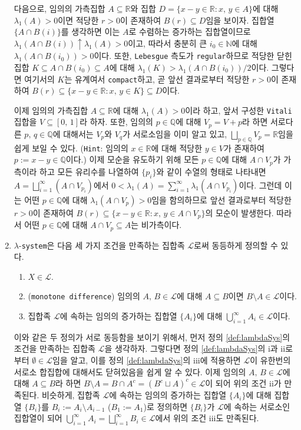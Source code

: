 \begin{enumerate}[label = \textsf{\textbf{\arabic*}}]
    다음으로, 임의의 가측집합 $A\subseteq\mathbb{R}$와 집합 $D=\{x-y\in\mathbb{R}:x,\,y\in A\}$에 대해 $\lambda_1(A)>0$이면 적당한 $r>0$이 존재하여 $B(r)\subseteq D$임을 보이자. 집합열 $\{A\cap B(i)\}$를 생각하면 이는 $A$로 수렴하는 증가하는 집합열이므로 $\lambda_1(A\cap B(i))\uparrow\lambda_1(A)>0$이고, 따라서 충분히 큰 $i_0\in\mathbb{N}$에 대해 $\lambda_1(A\cap B(i_0))>0$이다. 또한, \texttt{Lebesgue} 측도가 \texttt{regular}하므로 적당한 닫힌집합 $K\subseteq A\cap B(i_0)\subseteq A$에 대해 $\lambda_1(K)>\lambda_1(A\cap B(i_0))/2$이다. 그렇다면 여기서의 $K$는 유계여서 \texttt{compact}하고, 곧 앞선 결과로부터 적당한 $r>0$이 존재하여 $B(r)\subseteq\{x-y\in\mathbb{R}:x,\,y\in K\}\subseteq D$이다.
    
    이제 임의의 가측집합 $A\subseteq\mathbb{R}$에 대해 $\lambda_1(A)>0$이라 하고, 앞서 구성한 \texttt{Vitali} 집합을 $V\subseteq[0,\,1]$라 하자. 또한, 임의의 $p\in\mathbb{Q}$에 대해 $V_p=V+p$라 하면 서로다른 $p,\,q\in\mathbb{Q}$에 대해서는 $V_p$와 $V_q$가 서로소임을 이미 알고 있고, $\bigsqcup_{p\in\mathbb{Q}}V_p=\mathbb{R}$임을 쉽게 보일 수 있다. (\texttt{Hint}: 임의의 $x\in\mathbb{R}$에 대해 적당한 $y\in V$가 존재하여 $p:=x-y\in\mathbb{Q}$이다.) 이제 모순을 유도하기 위해 모든 $p\in\mathbb{Q}$에 대해 $A\cap V_p$가 가측이라 하고 모든 유리수를 나열하여 $\{p_i\}$와 같이 수열의 형태로 나타내면 $A=\bigsqcup_{i=1}^\infty(A\cap V_{p_i})$에서 $0<\lambda_1(A)=\sum_{i=1}^\infty\lambda_1(A\cap V_{p_i})$이다. 그런데 이는 어떤 $p\in\mathbb{Q}$에 대해 $\lambda_1(A\cap V_p)>0$임을 함의하므로 앞선 결과로부터 적당한 $r>0$이 존재하여 $B(r)\subseteq\{x-y\in\mathbb{R}:x,\,y\in A\cap V_p\}$의 모순이 발생한다. 따라서 어떤 $p\in\mathbb{Q}$에 대해 $A\cap V_p\subseteq A$는 비가측이다.
    \item $\lambda$-\texttt{system}은 다음 세 가지 조건을 만족하는 집합족 $\mathcal{L}$로써 동등하게 정의할 수 있다.
        \begin{enumerate}
            \item $X\in\mathcal{L}$.
            \item (\texttt{monotone \texttt{difference}}) 임의의 $A,\,B\in\mathcal{L}$에 대해 $A\subseteq B$이면 $B\setminus A\in\mathcal{L}$이다.
            \item 집합족 $\mathcal{L}$에 속하는 임의의 증가하는 집합열 $\{A_i\}$에 대해 $\bigcup_{i=1}^\infty A_i\in\mathcal{L}$이다.
        \end{enumerate}
    이와 같은 두 정의가 서로 동등함을 보이기 위해서, 먼저 정의 \ref{def:lambdaSys}의 조건을 만족하는 집합족 $\mathcal{L}$을 생각하자. 그렇다면 정의 \ref{def:lambdaSys}의 i과 ii로부터 $\emptyset\in\mathcal{L}$임을 알고, 이를 정의 \ref{def:lambdaSys}의 iii에 적용하면 $\mathcal{L}$이 유한번의 서로소 합집합에 대해서도 닫혀있음을 쉽게 알 수 있다. 이제 임의의 $A,\,B\in\mathcal{L}$에 대해 $A\subseteq B$라 하면 $B\setminus A=B\cap A^c=(B^c\sqcup A)^c\in\mathcal{L}$이 되어 위의 조건 ii가 만족된다. 비슷하게, 집합족 $\mathcal{L}$에 속하는 임의의 증가하는 집합열 $\{A_i\}$에 대해 집합열 $\{B_i\}$를 $B_i:=A_i\setminus A_{i-1}$ ($B_1:=A_1$)로 정의하면 $\{B_i\}$가 $\mathcal{L}$에 속하는 서로소인 집합열이 되어 $\bigcup_{i=1}^\infty A_i=\bigsqcup_{i=1}^\infty B_i\in\mathcal{L}$에서 위의 조건 iii도 만족된다.


\end{enumerate}

